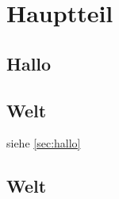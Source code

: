 \chapter{Hauptteil}\label{cha:Hauptteil}
\section{Hallo}\label{sec:Halloh}

\blindtext[20]


\section{Welt}\label{sec:Halloh2}


siehe \ref{sec:hallo}


\blindtext[20]


\section{Welt}\label{sec:Welth}

\blindtext[20]
